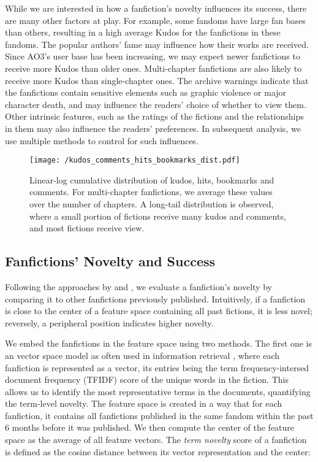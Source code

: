 \documentclass[a4paper]{article}
\begin{document}
While we are interested in how a fanfiction's novelty influences its success, there are many other factors at play. For example, some fandoms have large fan bases than others, resulting in a high average Kudos for the fanfictions in these fandoms. The popular authors' fame may influence how their works are received. Since AO3's user base has been increasing, we may expect newer fanfictions to receive more Kudos than older ones. Multi-chapter fanfictions are also likely to receive more Kudos than single-chapter ones. The archive warnings indicate that the fanfictions contain sensitive elements such as graphic violence or major character death, and may influence the readers' choice of whether to view them.  Other intrinsic features, such as the ratings of the fictions and the relationships in them may also influence the readers' preferences. In subsequent analysis, we use multiple methods to control for such influences.

\begin{figure}
    \centering
        \texttt{[image: /kudos\_comments\_hits\_bookmarks\_dist.pdf]}
        \caption{Linear-log cumulative distribution of kudos, hits, bookmarks and comments. For multi-chapter fanfictions, we average these values over the number of chapters. A long-tail distribution is observed, where a small portion of fictions receive many kudos and comments, and most fictions receive view.}
        \label{fig:kudos_dist}
\end{figure}


\subsection*{Fanfictions' Novelty and Success}
Following the approaches by \cite{askin2017makes} and \cite{de2015game}, we evaluate a fanfiction's novelty by comparing it to other fanfictions previously published. Intuitively, if a fanfiction is close to the center of a feature space containing all past fictions, it is less novel; reversely, a peripheral position indicates higher novelty. 

We embed the fanfictions in the feature space using two methods. The first one is an vector space model as often used in information retrieval \cite{turney2010frequency}, where each fanfiction is represented as a vector, its entries being the term frequency-intersed document frequency (TFIDF) score of the unique words in the fiction. This allows us to identify the most representative terms in the documents, quantifying the term-level novelty. The feature space is created in a way that for each fanfiction, it contains all fanfictions published in the same fandom within the past 6 months before it was published. We then compute the center of the feature space as the average of all feature vectors. The \emph{term novelty} score of a fanfiction is defined as the cosine distance between its vector representation and the center:
\end{document}
